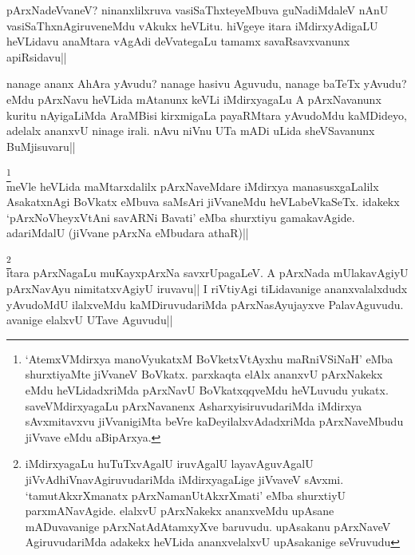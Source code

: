\stext

\begin{artha}
pArxNadeVvaneV? ninanxlilxruva vasiSaThxteyeMbuva guNadiMdaleV nAnU 
vasiSaThxnAgiruveneMdu vAkukx heVLitu. hiVgeye itara iMdirxyAdigaLU 
heVLidavu anaMtara vAgAdi deVvategaLu tamamx savaRsavxvanunx 
apiRsidavu||
\end{artha}


\begin{artha}
nanage ananx AhAra yAvudu? nanage hasivu Aguvudu, nanage baTeTx 
yAvudu? eMdu pArxNavu heVLida mAtanunx keVLi iMdirxyagaLu A 
pArxNavanunx kuritu nAyigaLiMda AraMBisi kirxmigaLa payaRMtara 
yAvudoMdu kaMDideyo, adelalx ananxvU ninage irali. nAvu niVnu UTa mADi 
uLida sheVSavanunx BuMjisuvaru|| 
\end{artha}


\begin{artha}
\footnote[1]{`AtemxVMdirxya manoVyukatxM BoVketxVtAyxhu maRniVSiNaH' 
eMba shurxtiyaMte jiVvaneV BoVkatx. parxkaqta elAlx ananxvU pArxNakekx 
eMdu heVLidadxriMda pArxNavU BoVkatxqqveMdu heVLuvudu yukatx. 
saveVMdirxyagaLu pArxNavanenx AsharxyisiruvudariMda iMdirxya 
sAvxmitavxvu jiVvanigiMta beVre kaDeyilalxvAdadxriMda pArxNaveMbudu 
jiVvave eMdu aBipArxya.}\\
meVle heVLida maMtarxdalilx pArxNaveMdare iMdirxya manasusxgaLalilx 
AsakatxnAgi BoVkatx eMbuva saMsAri jiVvaneMdu heVLabeVkaSeTx. idakekx 
`pArxNoVheyxVtAni savARNi Bavati' eMba shurxtiyu gamakavAgide. 
adariMdalU (jiVvane pArxNa eMbudara athaR)||
\end{artha}


\begin{artha}
\footnote[2]{iMdirxyagaLu huTuTxvAgalU iruvAgalU layavAguvAgalU 
jiVvAdhiVnavAgiruvudariMda iMdirxyagaLige jiVvaveV sAvxmi. 
`tamutAkxrXmanatx pArxNamanUtAkxrXmati' eMba shurxtiyU parxmANavAgide. 
elalxvU pArxNakekx ananxveMdu upAsane mADuvavanige pArxNatAdAtamxyXve 
baruvudu. upAsakanu pArxNaveV AgiruvudariMda adakekx heVLida 
ananxvelalxvU upAsakanige seVruvudu}\\
itara pArxNagaLu muKayxpArxNa savxrUpagaLeV. A pArxNada mUlakavAgiyU 
pArxNavAyu nimitatxvAgiyU iruvavu|| I riVtiyAgi tiLidavanige 
ananxvalalxdudx yAvudoMdU ilalxveMdu kaMDiruvudariMda pArxNasAyujayxve 
PalavAguvudu. avanige elalxvU UTave Aguvudu||
\end{artha}

